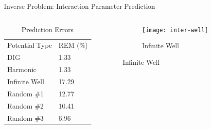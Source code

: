 \documentclass{beamer}
\begin{document}
\begin{frame}{Inverse Problem: Interaction Parameter Prediction}
    \begin{columns}
        \begin{column}{0.4\textwidth}
            \begin{table}[]
                \centering
                \caption{Prediction Errors}
                \begin{tabular}{ll}
                    Potential Type & REM (\%) \\
                    DIG            & 1.33     \\
                    Harmonic       & 1.33     \\
                    Infinite Well  & 17.29    \\
                    Random \#1     & 12.77    \\
                    Random \#2     & 10.41    \\
                    Random \#3     & 6.96                    
                \end{tabular}
            \end{table}
        \end{column}
        \begin{column}{0.8\textwidth}
        \graphicspath{{"../figs/training/interaction/"}}
        \begin{figure}[H]
            \begin{subfigure}[t]{0.80\textwidth}
                \texttt{[image: inter-well]}
            \caption{Infinite Well}
            \end{subfigure}
        \end{figure}
        \end{column}
    \end{columns}
\end{frame}
\end{document}
